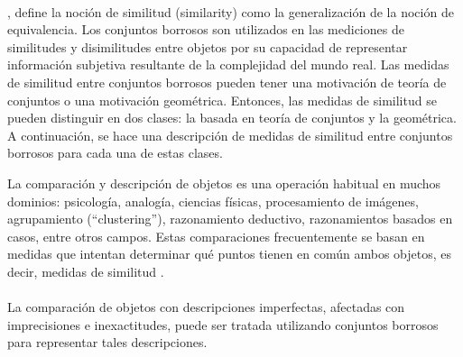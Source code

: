 \\
\citet{zadeh1971similarity}, define la noción de similitud (similarity) como la generalización de la noción de equivalencia. Los conjuntos borrosos son utilizados en las mediciones de similitudes y disimilitudes entre objetos por su capacidad de representar información subjetiva resultante de la complejidad del mundo real. Las medidas de similitud entre conjuntos borrosos pueden tener una motivación de teoría de conjuntos o una motivación geométrica. Entonces, las medidas de similitud se pueden distinguir en dos clases: la basada en teoría de conjuntos y la geométrica.
A continuación, se hace una descripción de medidas de similitud entre conjuntos borrosos para cada una de estas clases.

La comparación y descripción de objetos es una operación habitual en muchos dominios: psicología, analogía, ciencias físicas, procesamiento de imágenes, agrupamiento (``clustering''), razonamiento deductivo, razonamientos basados en casos, entre otros campos. Estas comparaciones frecuentemente se basan en medidas que intentan determinar qué puntos tienen en común ambos objetos, es decir, medidas de similitud \cite[]{bouchon2008similarities}.\\
\\
La comparación de objetos con descripciones imperfectas, afectadas con imprecisiones e inexactitudes, puede ser tratada utilizando conjuntos borrosos para representar tales descripciones.

